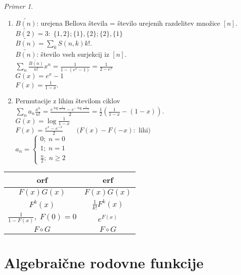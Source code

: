\documentclass[a4paper, 12pt]{book}
\theoremstyle{definition}
\theoremstyle{remark}
\newtheorem*{ex}{Primer}
\begin{document}
\begin{ex} \text{} \\
  \begin{enumerate}[label=(\arabic*)]
    \item $\widetilde{B(n)}$: urejena Bellova števila = število urejenih razdelitev množice $[n]$. \\
      $\widetilde{B(2)} = 3: \; \{1,2\}; \{1\},\{2\}; \{2\},\{1\}$ \\
      $\widetilde{B(n)} = \sum_k S(n,k) k!$. \\
      $\widetilde{B(n)}$: število vseh surjekcij iz $[n]$. \\
      $\sum_n \frac{\widetilde{B(n)}}{n!} x^n = \frac{1}{1-(e^x-1)} = \frac{1}{2-e^x}$ \\
      $G(x) = e^x-1$ \\
      $F(x) = \frac{1}{1-x}$.
    \item Permutacije z lihim številom ciklov \\
      $\sum_n a_n \frac{x^n}{n!} = \frac{e^{\log \frac{1}{1-x}} - e^{-\log \frac{1}{1-x}}}{2} =
        \frac{1}{2} \left(\frac{1}{1-x} - (1-x)\right)$. \\
      $G(x) = \log \frac{1}{1-x}$ \\
      $F(x) = \frac{e^x - e^{-x}}{2} \qquad (F(x)-F(-x):$ lihi$)$ \\
      $a_n = \begin{cases}
        0; \; n = 0 \\
        1; \; n = 1 \\
        \frac{n}{2}; \; n \geq 2
      \end{cases}$
  \end{enumerate}  
\end{ex}
\begin{center}
  \begin{tabular}{c | c}
    orf & erf \\
    \hline
    $F(x) G(x)$ & $F(x) G(x)$ \\
    $F^k(x)$ & $\frac{1}{k!} F^k(x)$ \\
    $\frac{1}{1-F(x)}, \; F(0) = 0$ & $e^{F(x)}$ \\
    $F \circ G$ & $F \circ G$
  \end{tabular}
\end{center}


\section{Algebraične rodovne funkcije}
\end{document}
